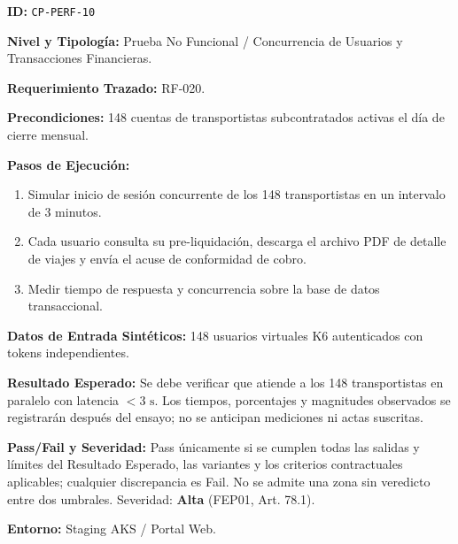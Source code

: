 \par\noindent\textbf{ID:} \texttt{C\allowbreak{}P\allowbreak{}-\allowbreak{}P\allowbreak{}E\allowbreak{}R\allowbreak{}F\allowbreak{}-\allowbreak{}1\allowbreak{}0\allowbreak{}}\par
\par\noindent\textbf{Nivel y Tipología:} Prueba No Funcional / Concurrencia de Usuarios y Transacciones Financieras.\par
\par\noindent\textbf{Requerimiento Trazado:} RF-020.\par
\par\noindent\textbf{Precondiciones:} 148 cuentas de transportistas subcontratados activas el día de cierre mensual.\par
\par\noindent\textbf{Pasos de Ejecución:} \par
\begin{enumerate}
\item Simular inicio de sesión concurrente de los 148 transportistas en un intervalo de 3 minutos.
\item Cada usuario consulta su pre-liquidación, descarga el archivo PDF de detalle de viajes y envía el acuse de conformidad de cobro.
\item Medir tiempo de respuesta y concurrencia sobre la base de datos transaccional.
\end{enumerate}
\par\noindent\textbf{Datos de Entrada Sintéticos:} 148 usuarios virtuales K6 autenticados con tokens independientes.\par
\par\noindent\textbf{Resultado Esperado:} Se debe verificar que atiende a los 148 transportistas en paralelo con latencia \(< 3\text{ s}\). Los tiempos, porcentajes y magnitudes observados se registrarán después del ensayo; no se anticipan mediciones ni actas suscritas.\par
\par\noindent\textbf{Pass/Fail y Severidad:} Pass únicamente si se cumplen todas las salidas y límites del Resultado Esperado, las variantes y los criterios contractuales aplicables; cualquier discrepancia es Fail. No se admite una zona sin veredicto entre dos umbrales. Severidad: \textbf{Alta} (FEP01, Art. 78.1).\par
\par\noindent\textbf{Entorno:} Staging AKS / Portal Web.\par







